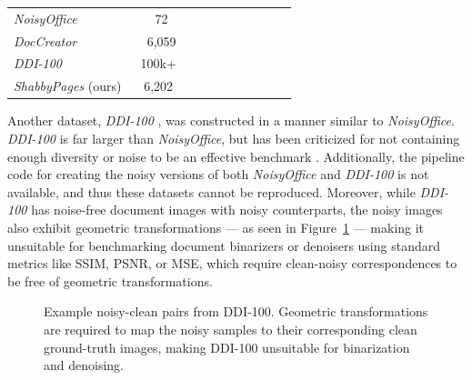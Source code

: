 \documentclass[runningheads]{llncs}
\newcommand{\cmark}{{\color{ForestGreen}\ding{51}}}%
\newcommand{\xmark}{{\color{Maroon}\ding{55}}}%
\begin{document}
\begin{table}[]
\begin{tabular}{lclllllll}
         \midrule
         \emph{NoisyOffice} \cite{ref_NoisyOffice} & 72  & \cmark & \cmark &  \cmark & \xmark & \xmark & \xmark & \xmark \\ %
         \emph{DocCreator} \cite{ref_DocCreator} & 6,059 & \cmark & \cmark & \cmark & \cmark & \cmark & \xmark &\cmark\\
         \emph{DDI-100} \cite{ddi-100-2019} & 100k+~ & \cmark & \cmark & \cmark & \xmark & \xmark & \cmark & \xmark\\
         \emph{ShabbyPages} (ours)~ & 6,202~ & \cmark & \cmark  & \cmark~ & \cmark~ & \cmark & \cmark & \cmark \\ %
         \bottomrule
    \end{tabular}
\end{table}

Another dataset, \emph{DDI-100} \cite{ddi-100-2019}, was constructed in a manner similar to \emph{NoisyOffice}.
\emph{DDI-100} is far larger than \emph{NoisyOffice}, but has been criticized for not containing enough diversity or noise to be an effective benchmark \cite{detection-masking-2022}.
Additionally, the pipeline code for creating the noisy versions of both \emph{NoisyOffice} and \emph{DDI-100} is not available, and thus these datasets cannot be reproduced.
Moreover, while \emph{DDI-100} has noise-free document images with noisy counterparts, the noisy images also exhibit geometric transformations --- as seen in Figure~\ref{fig:ddi-100-samples} --- making it unsuitable for benchmarking document binarizers or denoisers using standard metrics like SSIM, PSNR, or MSE, which require clean-noisy correspondences to be free of geometric transformations.

\begin{figure}
    \centering{}
    \caption{Example noisy-clean pairs from DDI-100. Geometric transformations are required to map the noisy samples to their corresponding clean ground-truth images, making DDI-100 unsuitable for binarization and denoising.}
    \label{fig:ddi-100-samples}
\end{figure}
\end{document}
